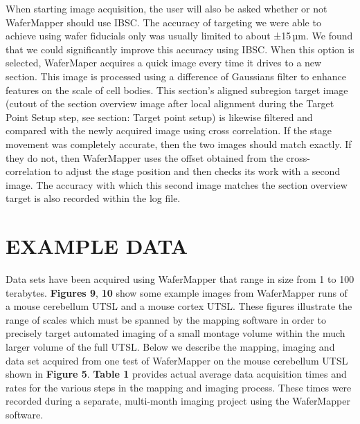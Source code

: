 \documentclass{article}
\begin{document}
When starting image acquisition, the user will also be asked whether or not WaferMapper should use IBSC. The accuracy of targeting we were able to achieve using wafer fiducials only was usually limited to about ±15\,µm. We found that we could significantly improve this accuracy using IBSC. When this option is selected, WaferMaper acquires a quick image every time it drives to a new section. This image is processed using a difference of Gaussians filter to enhance features on the scale of cell bodies. This section’s aligned subregion target image (cutout of the section overview image after local alignment during the Target Point Setup step, see section: Target point setup) is likewise filtered and compared with the newly acquired image using cross correlation. If the stage movement was completely accurate, then the two images should match exactly. If they do not, then WaferMapper uses the offset obtained from the cross-correlation to adjust the stage position and then checks its work with a second image. The accuracy with which this second image matches the section overview target is also recorded within the log file.

\section*{EXAMPLE DATA}

Data sets have been acquired using WaferMapper that range in size from 1 to 100 terabytes. \textbf{Figures 9}, \textbf{10} show some example images from WaferMapper runs of a mouse cerebellum UTSL and a mouse cortex UTSL. These figures illustrate the range of scales which must be spanned by the mapping software in order to precisely target automated imaging of a small montage volume within the much larger volume of the full UTSL. Below we describe the mapping, imaging and data set acquired from one test of WaferMapper on the mouse cerebellum UTSL shown in \textbf{Figure 5}. \textbf{Table 1} provides actual average data acquisition times and rates for the various steps in the mapping and imaging process. These times were recorded during a separate, multi-month imaging project using the WaferMapper software.
\end{document}
